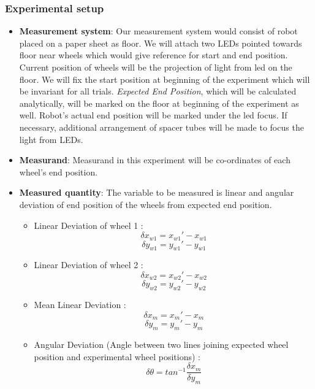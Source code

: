 \subsubsection*{Experimental setup}
\begin{itemize}
\item \textbf{Measurement system}: Our measurement system would consist of robot placed on a paper sheet as floor. We will attach two LEDs pointed towards floor near wheels which would give reference for start and end position. Current position of wheels will be the projection of light from led on the floor. We will fix the start position at beginning of the experiment which will be invariant for all trials. \textit{Expected End Position}, which will be calculated analytically, will be marked on the floor at beginning of the experiment as well. Robot's actual end position will be marked under the led focus. If necessary, additional arrangement of spacer tubes will be made to focus the light from LEDs. 

\item \textbf{Measurand}: Measurand in this experiment will be co-ordinates of each wheel's end position. 

\item \textbf{Measured quantity}: The variable to be measured is linear and angular deviation of end position of the wheels from expected end position. 
\begin{itemize}
	\item Linear Deviation of wheel 1 : 
	$$\delta x_{w1} = x_{w1}' - x_{w1}$$
	$$\delta y_{w1} = y_{w1}' - y_{w1}$$
	\item Linear Deviation of wheel 2 : 
	$$\delta x_{w2} = x_{w2}' - x_{w2}$$
	$$\delta y_{w2} = y_{w2}' - y_{w2}$$
	\item Mean Linear Deviation :  
	$$\delta x_{m} = x_{m}' - x_{m}$$
	$$\delta y_{m} = y_{m}' - y_{m}$$
	\item Angular Deviation (Angle between two lines joining expected wheel position and experimental wheel positions) : 
	$$\delta \theta = tan^{-1}\frac{\delta x_{m}}{\delta y_{m}}$$
\end{itemize}
\end{itemize}

